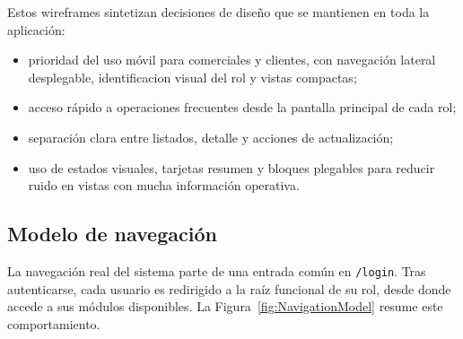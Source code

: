 Estos wireframes sintetizan decisiones de diseño que se mantienen en toda la aplicación:

\begin{itemize}
    \item prioridad del uso móvil para comerciales y clientes, con navegación lateral desplegable, identificacion visual del rol y vistas compactas;
    \item acceso rápido a operaciones frecuentes desde la pantalla principal de cada rol;
    \item separación clara entre listados, detalle y acciones de actualización;
    \item uso de estados visuales, tarjetas resumen y bloques plegables para reducir ruido en vistas con mucha información operativa.
\end{itemize}

\subsection{Modelo de navegación}

La navegación real del sistema parte de una entrada común en \texttt{/login}. Tras autenticarse, cada usuario es redirigido a la raíz funcional de su rol, desde donde accede a sus módulos disponibles. La Figura~\ref{fig:NavigationModel} resume este comportamiento.

